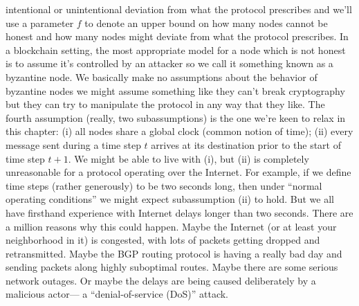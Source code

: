 intentional or unintentional deviation
from what the protocol prescribes and
we'll use a parameter $f$ to denote
an upper bound on how many nodes cannot
be honest and how many nodes might deviate from what the protocol prescribes. In a blockchain setting,
the most appropriate model for a
node which is not honest is to assume
it's controlled by an attacker so we call it
something known as a byzantine node. We
basically make no assumptions about the
behavior of byzantine nodes we might
assume something like they can't break
cryptography but they can try to
manipulate the protocol in any way that they like.
The fourth assumption (really, two subassumptions) is the one we’re keen to relax in this
chapter: (i) all nodes share a global clock (common notion of time); (ii) every message sent during a time step $t$ arrives
at its destination prior to the start of time step $t + 1$. We might be able to live with (i),
but (ii) is completely unreasonable for a protocol operating over the Internet. For example,
if we define time steps (rather generously) to be two seconds long, then under “normal
operating conditions” we might expect subassumption (ii) to hold. But we all have firsthand experience with Internet delays longer than two seconds. 
There are a million reasons why this could happen. Maybe the Internet (or at least your neighborhood in it) is congested,
with lots of packets getting dropped and retransmitted. Maybe the BGP routing protocol is
having a really bad day and sending packets along highly suboptimal routes. Maybe there
are some serious network outages. Or maybe the delays are being caused deliberately by a
malicious actor— a “denial-of-service (DoS)” attack.

